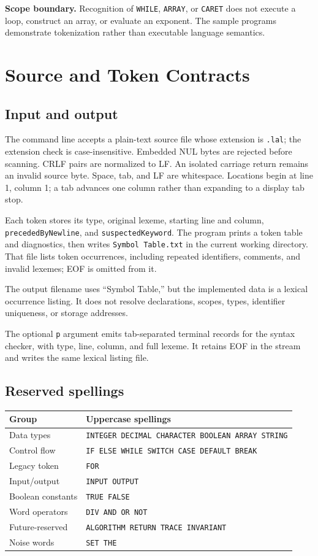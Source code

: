 \documentclass[11pt,a4paper]{article}
\newcommand{\code}[1]{\texttt{#1}}
\newcommand{\callout}[1]{\par\smallskip\colorbox{cream}{\parbox{\dimexpr\linewidth-2\fboxsep\relax}{\small #1}}\par\smallskip}
\begin{document}
\callout{\textbf{Scope boundary.} Recognition of \code{WHILE}, \code{ARRAY}, or
\code{CARET} does not execute a loop, construct an array, or evaluate an exponent.
The sample programs demonstrate tokenization rather than executable language semantics.}

\clearpage
\section{Source and Token Contracts}
\subsection{Input and output}
The command line accepts a plain-text source file whose extension is
\code{.lal}; the extension check is case-insensitive. Embedded NUL bytes are
rejected before scanning. CRLF pairs are normalized to LF. An isolated carriage
return remains an invalid source byte. Space, tab, and LF are whitespace.
Locations begin at line 1, column 1; a tab advances one column rather than
expanding to a display tab stop.

Each token stores its type, original lexeme, starting line and column,
\code{precededByNewline}, and \code{suspectedKeyword}. The program prints a
token table and diagnostics, then writes \code{Symbol Table.txt} in the current
working directory. That file lists token occurrences, including repeated
identifiers, comments, and invalid lexemes; EOF is omitted from it.

\callout{The output filename uses ``Symbol Table,'' but the implemented data is
a lexical occurrence listing. It does not resolve declarations, scopes, types,
identifier uniqueness, or storage addresses.}

The optional \code{p} argument emits tab-separated terminal records for the
syntax checker, with type, line, column, and full lexeme. It retains EOF in the
stream and writes the same lexical listing file.

\subsection{Reserved spellings}
\begin{tabularx}{\linewidth}{@{}p{33mm}Y@{}}
\toprule Group & Uppercase spellings \\\midrule
Data types & \code{INTEGER DECIMAL CHARACTER BOOLEAN ARRAY STRING} \\
Control flow & \code{IF ELSE WHILE SWITCH CASE DEFAULT BREAK} \\
Legacy token & \code{FOR} \\
Input/output & \code{INPUT OUTPUT} \\
Boolean constants & \code{TRUE FALSE} \\
Word operators & \code{DIV AND OR NOT} \\
Future-reserved & \code{ALGORITHM RETURN TRACE INVARIANT} \\
Noise words & \code{SET THE} \\\bottomrule
\end{tabularx}
\end{document}
